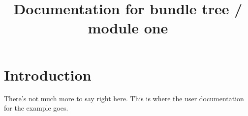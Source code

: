 \documentclass{article}
\begin{document}
\title{Documentation for bundle tree / module one}
\maketitle

\section{Introduction}

There's not much more to say right here.
This is where the user documentation for the example goes.
\end{document}

